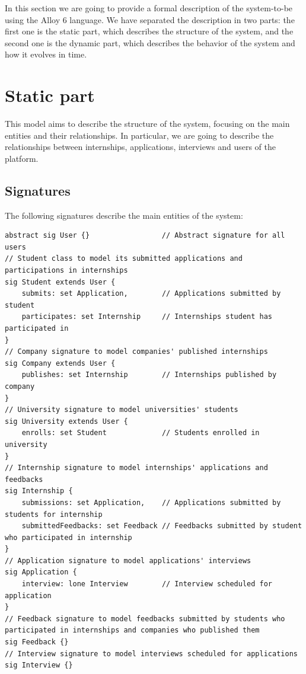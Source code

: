 In this section we are going to provide a formal description of the system-to-be using the Alloy 6 language. 
We have separated the description in two parts: the first one is the static part, which describes the structure of the system, and the second 
one is the dynamic part, which describes the behavior of the system and how it evolves in time.

\section{Static part}
This model aims to describe the structure of the system, focusing on the main entities and their relationships. In particular, we are going to 
describe the relationships between internships, applications, interviews and users of the platform.

\subsection{Signatures}
The following signatures describe the main entities of the system:
\begin{lstlisting}
abstract sig User {}                 // Abstract signature for all users
// Student class to model its submitted applications and participations in internships
sig Student extends User {           
    submits: set Application,        // Applications submitted by student
    participates: set Internship     // Internships student has participated in
}
// Company signature to model companies' published internships
sig Company extends User {
    publishes: set Internship        // Internships published by company
}
// University signature to model universities' students
sig University extends User {
    enrolls: set Student             // Students enrolled in university
}
// Internship signature to model internships' applications and feedbacks
sig Internship {
    submissions: set Application,    // Applications submitted by students for internship
    submittedFeedbacks: set Feedback // Feedbacks submitted by student who participated in internship
}               
// Application signature to model applications' interviews
sig Application {
    interview: lone Interview        // Interview scheduled for application
}
// Feedback signature to model feedbacks submitted by students who participated in internships and companies who published them
sig Feedback {}
// Interview signature to model interviews scheduled for applications
sig Interview {}
\end{lstlisting}

